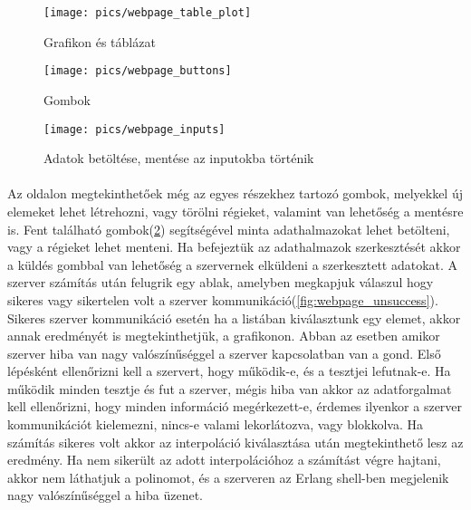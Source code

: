 	\begin{figure}[h]
		\texttt{[image: pics/webpage\_table\_plot]}
		\centering
		\caption{Grafikon és táblázat\label{fig:webpage_table_plot}}
	\end{figure}

	\begin{figure}[h]
		\texttt{[image: pics/webpage\_buttons]}
		\centering
		\caption{Gombok\label{fig:webpage_buttons}}
	\end{figure}

	\begin{figure}[h]
		\texttt{[image: pics/webpage\_inputs]}
		\centering
		\caption{Adatok betöltése, mentése az inputokba történik \label{fig:webpage_inputs}}
	\end{figure}

	\paragraph{}
	Az oldalon megtekinthetőek még az egyes részekhez tartozó gombok, melyekkel új elemeket lehet létrehozni, vagy törölni régieket, valamint van lehetőség a mentésre is.
	Fent található gombok(\ref{fig:webpage_buttons}) segítségével minta adathalmazokat lehet betölteni, vagy a régieket lehet menteni. Ha befejeztük az adathalmazok szerkesztését akkor a küldés gombbal van lehetőség a szervernek elküldeni a szerkesztett adatokat.
	\newline 
	A szerver számítás után felugrik egy ablak, amelyben megkapjuk válaszul hogy sikeres vagy sikertelen volt a szerver kommunikáció(\ref{fig:webpage_unsuccess}).\newline
	Sikeres szerver kommunikáció esetén ha a listában kiválasztunk egy elemet, akkor annak eredményét is megtekinthetjük, a grafikonon.
	\newline Abban az esetben amikor szerver hiba van nagy valószínűséggel a szerver kapcsolatban van a gond. Első lépésként ellenőrizni kell a szervert, hogy működik-e, és a tesztjei lefutnak-e. Ha működik minden tesztje és fut a szerver, mégis hiba van akkor az adatforgalmat kell ellenőrizni, hogy minden információ megérkezett-e, érdemes ilyenkor a szerver kommunikációt kielemezni, nincs-e valami lekorlátozva, vagy blokkolva.
	\newline
	Ha számítás sikeres volt akkor az interpoláció kiválasztása után megtekinthető lesz az eredmény. Ha nem sikerült az adott interpolációhoz a számítást végre hajtani, akkor nem láthatjuk a polinomot, és a szerveren az Erlang shell-ben megjelenik nagy valószínűséggel a hiba üzenet.

